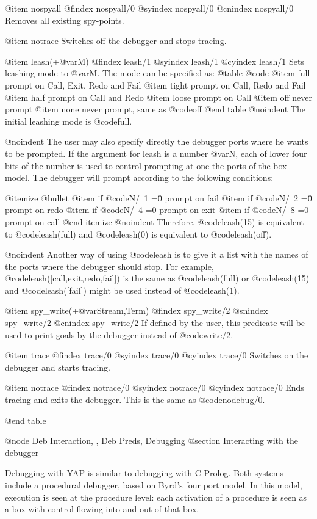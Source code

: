 {{{{{{{{{@item nospyall
@findex nospyall/0
@syindex nospyall/0
@cnindex nospyall/0
Removes all existing spy-points.

@item notrace
Switches off the debugger and stops tracing.

@item leash(+@var{M})
@findex leash/1
@syindex leash/1
@cyindex leash/1
 Sets leashing mode to @var{M}.
The mode can be specified as:
@table @code
@item full
prompt on Call, Exit, Redo and Fail
@item tight
prompt on Call, Redo and Fail
@item half
prompt on Call and Redo
@item loose
prompt on Call
@item off
never prompt
@item none
never prompt, same as @code{off}
@end table
@noindent
The initial leashing mode is @code{full}.


@noindent
The user may also specify directly the debugger ports 
where he wants to be prompted. If the argument for leash 
is a number @var{N}, each of lower four bits of the number is used to
control prompting at one the ports of the box model. The debugger will 
prompt according to the following conditions:

@itemize @bullet
@item
if @code{N/\ 1 =\= 0}  prompt on fail 
@item
if @code{N/\ 2 =\= 0} prompt on redo
@item
if @code{N/\ 4 =\= 0} prompt on exit
@item
if @code{N/\ 8 =\= 0} prompt on call
@end itemize
@noindent
Therefore, @code{leash(15)} is equivalent to @code{leash(full)} and
@code{leash(0)} is equivalent to @code{leash(off)}.

@noindent
Another way of using @code{leash} is to give it a list with the names of
the ports where the debugger should stop. For example,
@code{leash([call,exit,redo,fail])} is the same as @code{leash(full)} or
@code{leash(15)} and @code{leash([fail])} might be used instead of
@code{leash(1)}.

@item spy_write(+@var{Stream},Term)
@findex spy_write/2
@snindex spy_write/2
@cnindex spy_write/2
If defined by the user, this predicate will be used to print goals by
the debugger instead of @code{write/2}.

@item trace
@findex trace/0
@syindex trace/0
@cyindex trace/0
Switches on the debugger and starts tracing.

@item notrace
@findex notrace/0
@syindex notrace/0
@cyindex notrace/0
Ends tracing and exits the debugger. This is the same as
@code{nodebug/0}.

@end table


@node Deb Interaction, , Deb Preds, Debugging
@section Interacting with the debugger

Debugging with YAP is similar to debugging with C-Prolog. Both systems
include a procedural debugger, based on Byrd's four port model. In this
model, execution is seen at the procedure level: each activation of a
procedure is seen as a box with control flowing into and out of that
box.

}}}}}}}}}
